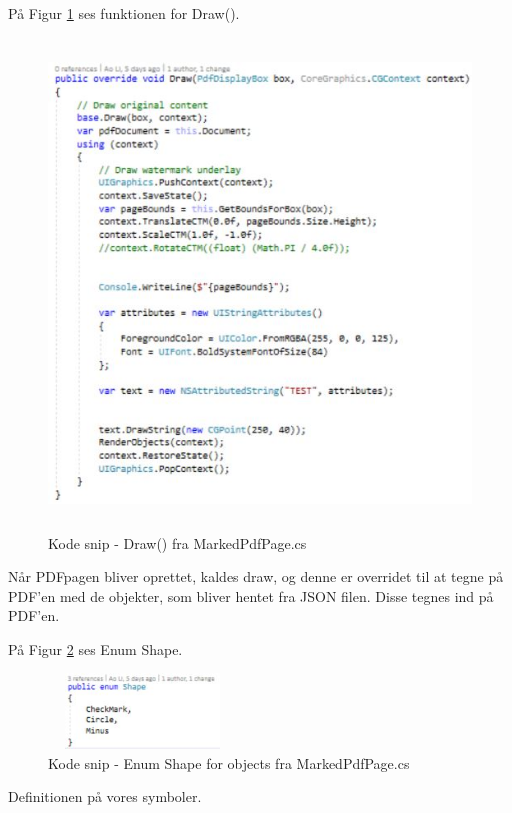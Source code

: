 På Figur \ref{fig:Draw} ses funktionen for Draw().
\begin{figure}[H] %
	\centering
	\includegraphics[height=13cm, width=15cm]{../ArkitekturDesign/Design/RegisterPDF/Draw}
	\caption{Kode snip - Draw() fra MarkedPdfPage.cs}
	\label{fig:Draw}
\end{figure}
Når PDFpagen bliver oprettet, kaldes draw, og denne er overridet til at tegne på PDF'en med de objekter, som bliver hentet fra JSON filen. Disse tegnes ind på PDF'en.

\clearpage

På Figur \ref{fig:Enum} ses Enum Shape.
\begin{figure}[H] %
	\centering
	\includegraphics[height=2cm, width=5cm]{../ArkitekturDesign/Design/RegisterPDF/Enum}
	\caption{Kode snip - Enum Shape for objects fra MarkedPdfPage.cs}
	\label{fig:Enum}
\end{figure}
Definitionen på vores symboler.

